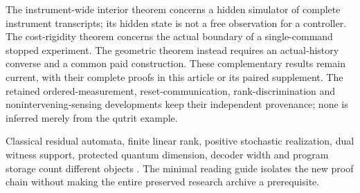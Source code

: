 The instrument-wide interior theorem concerns a hidden simulator of complete instrument transcripts; its hidden state is not a free observation for a controller. The cost-rigidity theorem concerns the actual boundary of a single-command stopped experiment. The geometric theorem instead requires an actual-history converse and a common paid construction. These complementary results remain current, with their complete proofs in this article or its paired supplement. The retained ordered-measurement, reset-communication, rank-discrimination and nonintervening-sensing developments keep their independent provenance; none is inferred merely from the qutrit example.

Classical residual automata, finite linear rank, positive stochastic realization, dual witness support, protected quantum dimension, decoder width and program storage count different objects \cite{RabinScott59,ThonJaeger15,PiunovskiyZhang24}. The minimal reading guide isolates the new proof chain without making the entire preserved research archive a prerequisite.

